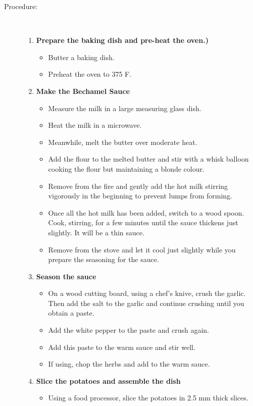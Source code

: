 \documentclass[11pt,letterpaper]{article}
\begin{document}
\begin{description}
\item[Procedure:]\ \\
	\begin{enumerate}
	\item {\bf Prepare the baking dish and pre-heat the oven.)}
		\begin{itemize}
		\item  Butter a baking dish.
		\item Preheat the oven to 375 F.
		\end{itemize}
	\item {\bf Make the Bechamel Sauce}
		\begin{itemize}
		\item Measure the milk in a large measuring glass dish.
		\item Heat the milk in a microwave.
		\item Meanwhile, melt the butter over moderate heat.
		\item Add the flour to the melted butter and stir with a whisk balloon cooking the flour but maintaining a blonde colour. 
		\item Remove from the fire and gently add the hot milk stirring vigorously in the beginning to prevent lumps from forming. 
		\item Once all the hot milk has been added, switch to a wood spoon. Cook, stirring, for a few minutes until the sauce thickens just slightly. It will be a thin sauce.
		\item Remove from the stove and let it cool just slightly while you prepare the seasoning for the sauce.
		\end{itemize}
	\item {\bf Season the sauce}
		\begin{itemize}
        		\item On a wood cutting board, using a chef's knive, crush the garlic. Then add the salt to the garlic and continue crushing until you obtain a paste.
		\item Add the white pepper to the paste and crush again.
		\item Add this paste to the warm sauce and stir well.
		\item If using, chop the herbs and add to the warm sauce. 	
		\end{itemize}
	\item {\bf Slice the potatoes and assemble the dish}
		\begin{itemize}
        		\item Using a food processor, slice the potatoes in 2.5 mm thick slices.

\end{itemize}
\end{enumerate}
\end{description}
\end{document}
